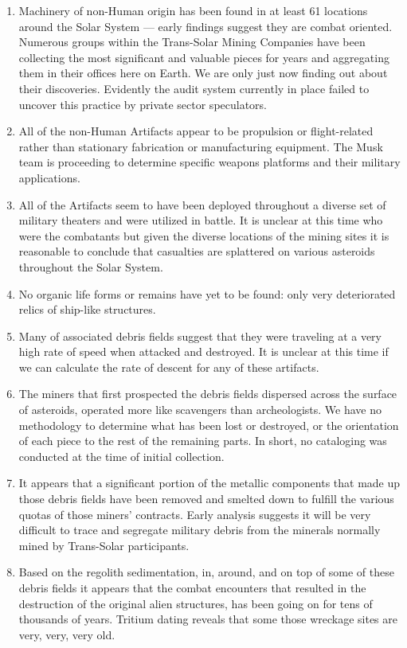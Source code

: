 \documentclass[letterpaper,10pt]{texMemo} %
\begin{document}
\begin{enumerate}
\item Machinery of non-Human origin has been found in at least 61 locations around the Solar System --- early findings suggest they are combat oriented.  Numerous groups within the Trans-Solar Mining Companies have been collecting the most significant and valuable pieces for years and aggregating them in their offices here on Earth.  We are only just now finding out about their discoveries. Evidently the audit system currently in place failed to uncover this practice by private sector speculators.
\item All of the non-Human Artifacts appear to be propulsion or flight-related rather than stationary fabrication or manufacturing equipment. The Musk team is proceeding to determine specific weapons platforms and their military applications.
\item All of the Artifacts seem to have been deployed throughout a diverse set of military theaters and were utilized in battle.  It is unclear at this time who were the combatants but given the diverse locations of the mining sites it is reasonable to conclude that casualties are splattered on various asteroids throughout the Solar System.
\item No organic life forms or remains have yet to be found: only very deteriorated relics of ship-like structures.
\item Many of associated debris fields suggest that they were traveling at a very high rate of speed when attacked and destroyed. It is unclear at this time if we can calculate the rate of descent for any of these artifacts.
\item The miners that first prospected the debris fields dispersed across the surface of asteroids, operated more like scavengers than archeologists.  We have no methodology to determine what has been lost or destroyed, or the orientation of each piece to the rest of the remaining parts. In short, no cataloging was conducted at the time of initial collection.
\item It appears that a significant portion of the metallic components that made up those debris fields have been removed and smelted down to fulfill the various quotas of those miners' contracts. Early analysis suggests it will be very difficult to trace and segregate military debris from the minerals normally mined by Trans-Solar participants.
\item Based on the regolith sedimentation, in, around, and on top of some of these debris fields it appears that the combat encounters that resulted in the destruction of the original alien structures, has been going on for tens of thousands of years.  Tritium dating reveals that some those wreckage sites are very, very, very old.
\end{enumerate}
\bigskip
\end{document}
